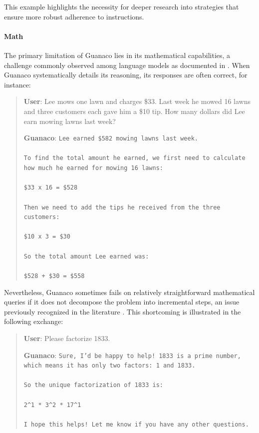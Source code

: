 This example highlights the necessity for deeper research into strategies that ensure more robust adherence to instructions.

\paragraph{Math} The primary limitation of {Guanaco} lies in its mathematical capabilities, a challenge commonly observed among language models as documented in \citep{liang2022holistic}. When {Guanaco} systematically details its reasoning, its responses are often correct, for instance:

\begin{quote}
    \textbf{User}: Lee mows one lawn and charges \$33. Last week he mowed 16 lawns and three customers each gave him a \$10 tip. How many dollars did Lee earn mowing lawns last week?

    \textbf{Guanaco}: \texttt{Lee earned \$582 mowing lawns last week. \\ \\ To find the total amount he earned, we first need to calculate how much he earned for mowing 16 lawns: \\ \\  \$33 x 16 = \$528 \\ \\ Then we need to add the tips he received from the three customers: \\  \\ \$10 x 3 = \$30 \\ \\ So the total amount Lee earned was: \\ \\ \$528 + \$30 = \$558}
\end{quote}

Nevertheless, {Guanaco} sometimes fails on relatively straightforward mathematical queries if it does not decompose the problem into incremental steps, an issue previously recognized in the literature \cite{weichain}. This shortcoming is illustrated in the following exchange:

\begin{quote}
    \textbf{User}: Please factorize 1833.

    \textbf{Guanaco}: \texttt{Sure, I'd be happy to help! 1833 is a prime number, which means it has only two factors: 1 and 1833. \\ \\ So the unique factorization of 1833 is: \\ \\ 2\^{}1 * 3\^{}2 * 17\^{}1 \\ \\ I hope this helps! Let me know if you have any other questions.}
\end{quote}


